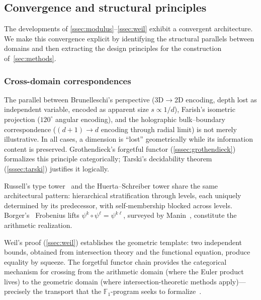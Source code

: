 \subsection{Convergence and structural
principles}\label{ssec:principles}

The developments of \cref{ssec:modulus}--\cref{ssec:weil}
exhibit a convergent architecture.  We make this convergence explicit
by identifying the structural parallels between domains and then
extracting the design principles for the construction of~\cref{sec:methods}.

\subsubsection{Cross-domain correspondences}

The parallel between Brunelleschi's perspective
(3D${}\to{}$2D encoding, depth lost as independent variable, encoded
as apparent size $s \propto 1/d$), Farish's isometric projection
($120^\circ$ angular encoding), and the holographic bulk--boundary
correspondence ($(d{+}1)\!\to\!d$ encoding through radial limit) is
not merely illustrative.  In all cases, a dimension is ``lost''
geometrically while its information content is preserved.
Grothendieck's forgetful functor (\cref{sssec:grothendieck})
formalizes this principle categorically; Tarski's decidability
theorem (\cref{sssec:tarski}) justifies it logically.

Russell's type tower~\cite{russell08} and the Huerta--Schreiber tower share the same
architectural pattern: hierarchical stratification through levels,
each uniquely determined by its predecessor, with self-membership
blocked across levels.  Borger's~\cite{borger09} Frobenius lifts
$\psi^k \circ \psi^\ell = \psi^{k\ell}$, surveyed by
Manin~\cite{manin13}, constitute the arithmetic realization.

Weil's proof (\cref{ssec:weil}) establishes the geometric
template: two independent bounds, obtained from intersection
theory and the functional equation, produce equality by squeeze.
The forgetful functor chain provides the categorical mechanism for
crossing from the arithmetic domain (where the Euler product lives)
to the geometric domain (where intersection-theoretic methods
apply)---precisely the transport that the $\mathbb{F}_1$-program
seeks to formalize~\cite{connes14}.

